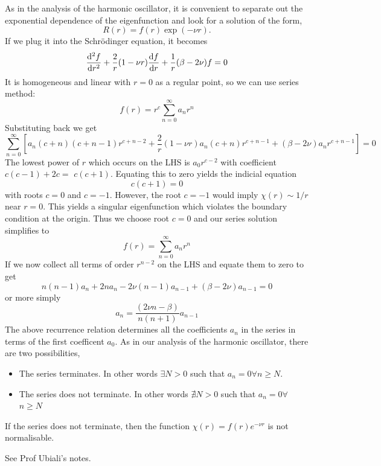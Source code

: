 \documentclass[a4paper,11pt]{article}
\begin{document}
As in the analysis of the harmonic oscillator, it is convenient to separate out the exponential dependence of the eigenfunction and look for a solution of the form,
\[
R(r)=f(r) \exp (-\nu r) .
\]
If we plug it into the Schrödinger equation, it becomes
\[
\frac{\mathrm{d}^2 f}{\mathrm{d} r^2}+\frac{2}{r}(1-\nu r) \frac{\mathrm{d} f}{\mathrm{d} r}+\frac{1}{r}(\beta-2 \nu) f=0
\]
It is homogeneous and linear with $r=0$ as a regular point, so we can use series method:
\[
	f(r)=r^c \sum_{n=0}^{\infty} a_n r^n
\]
Substituting back we get 
\[
	\sum_{n=0}^{\infty}\left[a_n(c+n)(c+n-1) r^{c+n-2}+\frac{2}{r}(1-\nu r) a_n(c+n) r^{c+n-1}+(\beta-2 \nu) a_n r^{c+n-1}\right]=0
\]
The lowest power of $r$ which occurs on the LHS is $a_0 r^{c-2}$ with coefficient $c(c-1)+2 c=$ $c(c+1)$. Equating this to zero yields the indicial equation
\[
c(c+1)=0
\]
with roots $c=0$ and $c=-1$. However, the root ${c}=-1$ would imply $\chi(r) \sim 1 / r$ near $r=0$. This yields a singular eigenfunction which violates the boundary condition at the origin. Thus we choose root $c=0$ and our series solution simplifies to
\[
f(r)=\sum_{n=0}^{\infty} a_n r^n
\]
If we now collect all terms of order $r^{n-2}$ on the LHS and equate them to zero to get
\[
n(n-1) a_n+2 n a_n-2 \nu(n-1) a_{n-1}+(\beta-2 \nu) a_{n-1}=0
\]
or more simply
\[
a_n=\frac{(2 \nu n-\beta)}{n(n+1)} a_{n-1}
\]
The above recurrence relation determines all the coefficients $a_n$ in the series in terms of the first coefficent $a_0$. As in our analysis of the harmonic oscillator, there are two possibilities,
\begin{itemize}
	\item The series terminates. In other words $\exists N>0$ such that $a_n=0 \forall n \geq N$.
	\item The series does not terminate. In other words $\nexists N>0$ such that $a_n=0 \forall$ $n \geq N$
\end{itemize}
\begin{proposition}
	If the series does not terminate, then the function $ \chi(r) = f(r) e^{-\nu r} $ is not normalisable.
\end{proposition}
See Prof Ubiali's notes. 
\end{document}
